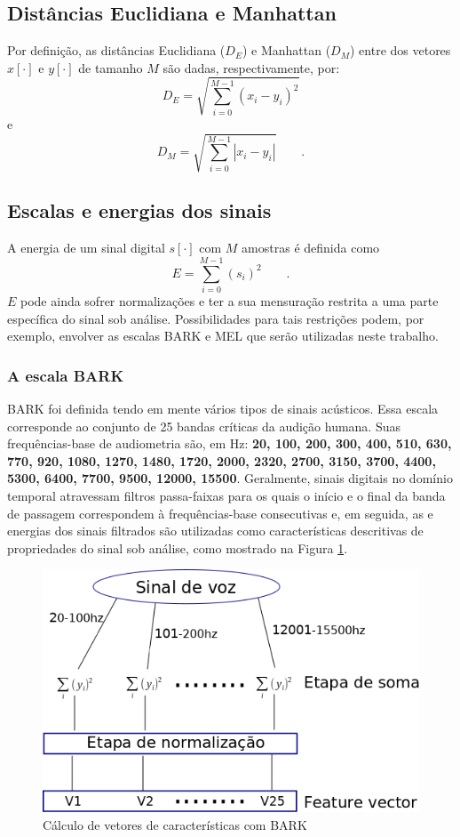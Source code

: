 \subsection{Distâncias Euclidiana e Manhattan}
    \par Por definição, as distâncias Euclidiana ($D_E$) e Manhattan ($D_M$) entre dos vetores $x[\cdot]$ e $y[\cdot]$ de tamanho $M$ são dadas, respectivamente, por:
    \begin{equation}
     D_E = \sqrt{\sum\limits_{i=0}^{M-1}(x_i - y_i)^2}   
    \end{equation}
e
    \begin{equation}
        D_M = \sqrt{\sum\limits_{i=0}^{M-1}|x_i - y_i|}   
        \qquad. 
    \end{equation}

\subsection{Escalas e energias dos sinais}
	\par A energia de um sinal digital $s[\cdot]$ com $M$ amostras é definida como
	\begin{equation}
	E = \sum\limits_{i=0}^{M-1}(s_i)^2 \qquad.   
	\end{equation}
	$E$ pode ainda sofrer normalizações e ter a sua mensuração restrita a uma parte específica do sinal sob análise. Possibilidades para tais restrições podem, por exemplo, envolver as escalas BARK e MEL \cite{XXXXXX} que serão utilizadas neste trabalho.
	\subsubsection{A escala BARK}
		\par BARK foi definida tendo em mente vários tipos de sinais acústicos. Essa escala corresponde ao conjunto de 25 bandas críticas da audição humana. Suas frequências-base de audiometria são, em Hz: \textbf{20, 100, 200, 300, 400, 510, 630, 770, 920, 1080, 1270, 1480, 1720, 2000, 2320, 2700, 3150, 3700, 4400, 5300, 6400, 7700, 9500, 12000, 15500}. Geralmente, sinais digitais no domínio temporal atravessam filtros passa-faixas \cite{XXXXXX} para os quais o início e o final da banda de passagem correspondem à frequências-base consecutivas e, em seguida, as e energias dos sinais filtrados são utilizadas como características descritivas de propriedades do sinal sob análise, como mostrado na Figura \ref{fig:barkfeaturevect}.
		\begin{figure}[h]
			\centering
			\includegraphics[width=0.6\linewidth]{images/barkFeatureVect}
			\caption{Cálculo de vetores de características com BARK}
			\label{fig:barkfeaturevect}
		\end{figure}
